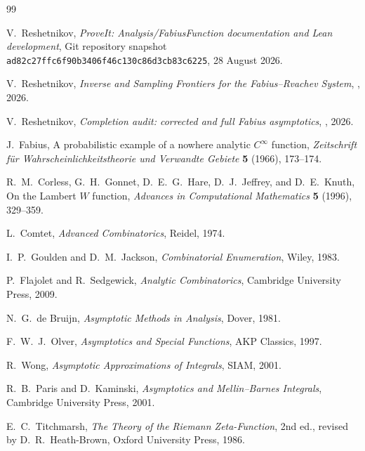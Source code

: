 \documentclass[11pt,oneside]{article}
\numberwithin{equation}{section}
\theoremstyle{definition}
\theoremstyle{remark}
\begin{document}
\begin{thebibliography}{99}

V.~Reshetnikov,
\emph{ProveIt: Analysis/FabiusFunction documentation and Lean development},
Git repository snapshot
\texttt{ad82c27ffc6f90b3406f46c130c86d3cb83c6225}, 28 August 2026.

V.~Reshetnikov,
\emph{Inverse and Sampling Frontiers for the Fabius--Rvachev System},
,
2026.

V.~Reshetnikov,
\emph{Completion audit: corrected and full Fabius asymptotics},
, 2026.

J.~Fabius,
A probabilistic example of a nowhere analytic $C^\infty$ function,
\emph{Zeitschrift f\"ur Wahrscheinlichkeitstheorie und Verwandte Gebiete}
\textbf{5} (1966), 173--174.

R.~M.~Corless, G.~H.~Gonnet, D.~E.~G.~Hare, D.~J.~Jeffrey, and D.~E.~Knuth,
On the Lambert $W$ function,
\emph{Advances in Computational Mathematics} \textbf{5} (1996), 329--359.

L.~Comtet,
\emph{Advanced Combinatorics},
Reidel, 1974.

I.~P.~Goulden and D.~M.~Jackson,
\emph{Combinatorial Enumeration},
Wiley, 1983.

P.~Flajolet and R.~Sedgewick,
\emph{Analytic Combinatorics},
Cambridge University Press, 2009.

N.~G.~de Bruijn,
\emph{Asymptotic Methods in Analysis},
Dover, 1981.

F.~W.~J.~Olver,
\emph{Asymptotics and Special Functions},
AKP Classics, 1997.

R.~Wong,
\emph{Asymptotic Approximations of Integrals},
SIAM, 2001.

R.~B.~Paris and D.~Kaminski,
\emph{Asymptotics and Mellin--Barnes Integrals},
Cambridge University Press, 2001.

E.~C.~Titchmarsh,
\emph{The Theory of the Riemann Zeta-Function}, 2nd ed.,
revised by D.~R.~Heath-Brown, Oxford University Press, 1986.

\end{thebibliography}
\end{document}
